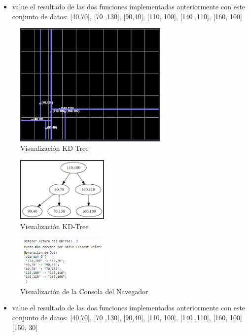 \documentclass{article}
\begin{document}
\begin{enumerate}
\begin{itemize}
   \item value el resultado de las dos funciones implementadas anteriormente con este conjunto de datos: [40,70], [70 ,130], [90,40], [110, 100], [140 ,110], [160, 100]
\end{itemize}

\begin{figure}[H]
\centering
\includegraphics[width=0.67\textwidth]{Img/prueba1.1.png}
\caption{Visualización KD-Tree}
\end{figure}

\begin{figure}[H]
\centering
\includegraphics[width=0.4\textwidth]{Img/prueba1.2.png}
\caption{Visualización KD-Tree}
\end{figure}

\begin{figure}[H]
\centering
\includegraphics[width=0.4\textwidth]{Img/prueba1.3.png}
\caption{Visualización de la Consola del Navegador}
\end{figure}

\begin{itemize}
   \item value el resultado de las dos funciones implementadas anteriormente con este conjunto de datos: [40,70], [70 ,130], [90,40], [110, 100], [140 ,110], [160, 100] [150, 30]
\end{itemize}


\end{enumerate}
\end{document}
